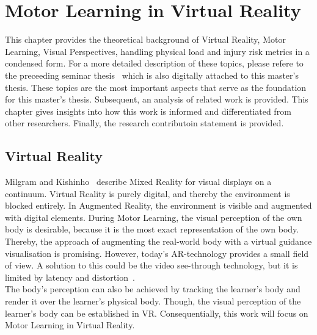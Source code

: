 \chapter{Motor Learning in Virtual Reality}
\label{chapter:theoretical_background}
This chapter provides the theoretical background of Virtual Reality, Motor Learning, Visual Perspectives, handling physical load and injury risk metrics in a condensed form. For a more detailed description of these topics, please refere to the preceeding seminar thesis~\cite{seminarThesis} which is also digitally attached to this master's thesis. These topics are the most important aspects that serve as the foundation for this master's thesis. Subsequent, an analysis of related work is provided. This chapter gives insights into how this work is informed and differentiated from other researchers. Finally, the research contributoin statement is provided.

\section{Virtual Reality}
\label{section:mixed_reality}
Milgram and Kishinho~\cite{mrcontinuum} describe Mixed Reality for visual displays on a continuum. Virtual Reality is purely digital, and thereby the environment is blocked entirely. In Augmented Reality, the environment is visible and augmented with digital elements. During Motor Learning, the visual perception of the own body is desirable, because it is the most exact representation of the own body. Thereby, the approach of augmenting the real-world body with a virtual guidance visualisation is promising. However, today's AR-technology provides a small field of view. A solution to this could be the video see-through technology, but it is limited by latency and distortion~\cite{max}.\\
The body's perception can also be achieved by tracking the learner's body and render it over the learner's physical body. Though, the visual perception of the learner's body can be established in VR. Consequentially, this work will focus on Motor Learning in Virtual Reality.

